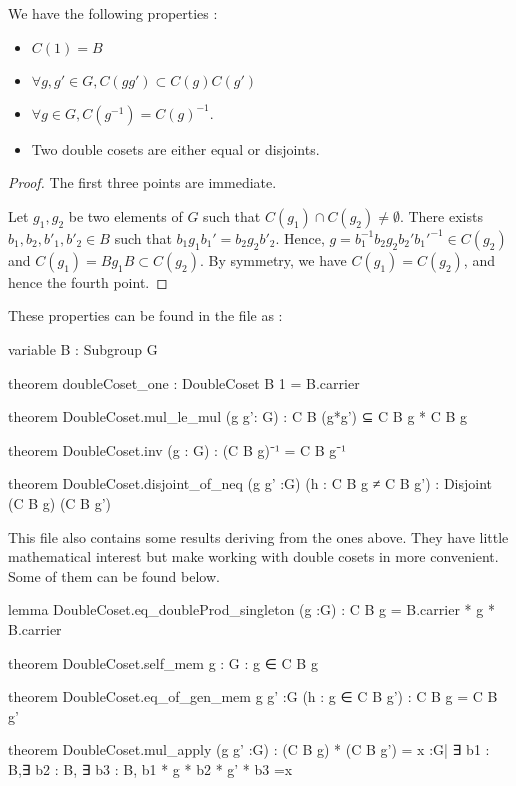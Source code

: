 \begin{proprietes} \label{prop:DC1}
    We have the following properties :
    \begin{itemize}
        \item  $C\left( 1 \right) = B$
        \item $\forall g,g'\in G,C\left( g g' \right) \subset C(g) C(g')$
        \item $\forall g \in G, C\left( g^{-1} \right) = C\left( g \right)^{-1}$.
        \item Two double cosets are either equal or disjoints.
    \end{itemize}
\end{proprietes}

\begin{proof}
    The first three points are immediate. 

    Let $g_1, g_2$ be two elements of $G$ such that $C\left( g_1 \right) \cap C\left( g_2 \right) \neq \emptyset$. There exists $b_1, b_2, b'_1, b'_2 \in B$ such that $b_1 g_1 b_1' = b_2 g_2 b'_2 $. Hence, $g = b_1^{-1} b_2 g_2 b_2' b_1'^{-1} \in  C\left( g_2 \right) $ and $C(g_1) = Bg_1B\subset C(g_2)$. By symmetry, we have $C\left( g_1 \right) = C\left( g_2 \right)$, and hence the fourth point.
\end{proof} 

These properties can be found in the  file as :
\begin{leancode}
variable {B : Subgroup G}

theorem doubleCoset_one : DoubleCoset B 1 = B.carrier

theorem DoubleCoset.mul_le_mul (g g': G) : C B (g*g') ⊆ C B g * C B g

theorem DoubleCoset.inv (g : G) : (C B g)⁻¹ = C B g⁻¹

theorem DoubleCoset.disjoint_of_neq (g g' :G) (h : C B g ≠ C B g') : 
  Disjoint (C B g) (C B g') 
\end{leancode}

This file also contains some results deriving from the ones above. They have little mathematical interest but make working with double cosets in \Lean more convenient. Some of them can be found below.

\begin{leancode}
lemma DoubleCoset.eq_doubleProd_singleton (g :G) : C B g = B.carrier * {g} * B.carrier

theorem DoubleCoset.self_mem {g : G} : g ∈ C B g

theorem DoubleCoset.eq_of_gen_mem {g g' :G} (h : g ∈ C B g') : C B g = C B g'

theorem DoubleCoset.mul_apply (g g' :G) :
  (C B g) * (C B g') = {x :G| ∃ b1 : B,∃ b2 : B, ∃ b3 : B, b1 * g * b2 * g' * b3 =x}
\end{leancode}


